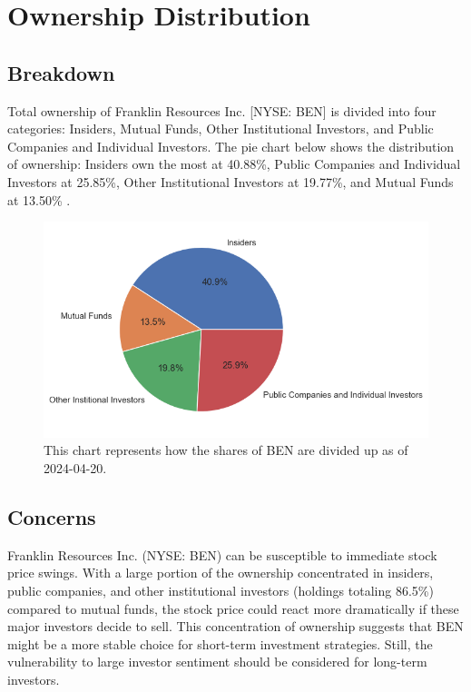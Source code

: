 \documentclass[9pt,a4paper,twoside]{tau}
\begin{document}
\section{Ownership Distribution}
    \subsection{Breakdown}
        
        Total ownership of Franklin Resources Inc. [NYSE: BEN] is divided into four categories: Insiders, Mutual Funds, Other Institutional Investors, and Public Companies and Individual Investors. The pie chart below shows the distribution of ownership: Insiders own the most at 40.88\%, Public Companies and Individual Investors at 25.85\%, Other Institutional Investors at 19.77\%, and Mutual Funds at 13.50\% \cite{tip-ranks-2024}.

            \begin{figure}[H]
                \centering
                \includegraphics[width=0.85\columnwidth]{Figures/OwnershipPieChart.png}
                \caption{This chart represents how the shares of BEN are divided up as of 2024-04-20.}
                \label{fig:figure}
            \end{figure}

    \subsection{Concerns}
    
        Franklin Resources Inc. (NYSE: BEN) can be susceptible to immediate stock price swings. With a large portion of the ownership concentrated in insiders, public companies, and other institutional investors (holdings totaling 86.5\%) compared to mutual funds, the stock price could react more dramatically if these major investors decide to sell. This concentration of ownership suggests that BEN might be a more stable choice for short-term investment strategies. Still, the vulnerability to large investor sentiment should be considered for long-term investors.
\end{document}
